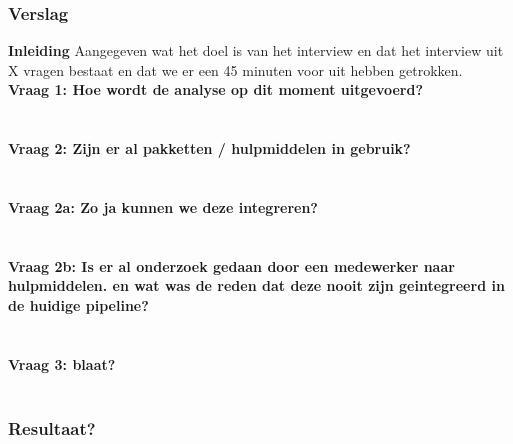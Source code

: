\subsubsection{Verslag}
\textbf{Inleiding}
Aangegeven wat het doel is van het interview en dat het interview uit X vragen bestaat en dat we er een 45 minuten voor uit hebben getrokken.\\
\textbf{Vraag 1: Hoe wordt de analyse op dit moment uitgevoerd?}\\
\lipsum[01]\\
\\
\textbf{Vraag 2: Zijn er al pakketten / hulpmiddelen in gebruik?}\\
\lipsum[02]\\
\\
\textbf{Vraag 2a: Zo ja kunnen we deze integreren?}\\
\lipsum[03]\\
\\
\textbf{Vraag 2b: Is er al onderzoek gedaan door een medewerker naar hulpmiddelen. en wat was de reden dat deze nooit zijn geintegreerd in de huidige pipeline?}\\
\lipsum[04]\\
\\
\textbf{Vraag 3: blaat?}\\
\lipsum[05]\\

\subsubsection{Resultaat?}
